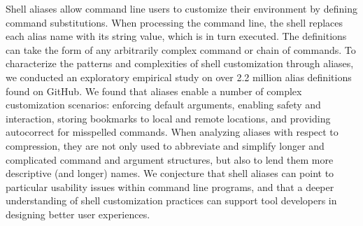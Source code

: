 Shell aliases allow command line users to customize their environment by defining command substitutions.
When processing the command line, the shell replaces each alias name with its string value, which is in turn executed.
The definitions can take the form of any arbitrarily complex command or chain of commands.
To characterize the patterns and complexities of shell customization through aliases, we conducted an exploratory empirical study on over 2.2 million alias definitions found on GitHub. \TODO
We found that aliases enable a number of complex customization scenarios: enforcing default arguments, enabling safety and interaction, storing bookmarks to local and remote locations, and providing autocorrect for misspelled commands.
When analyzing aliases with respect to compression, they are not only used to abbreviate and simplify longer and complicated command and argument structures, but also to lend them more descriptive (and longer) names.
We conjecture that shell aliases can point to particular usability issues within command line programs, and that a deeper understanding of shell customization practices can support tool developers in designing better user experiences.